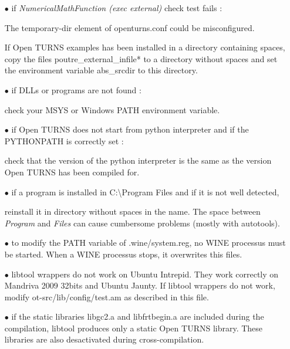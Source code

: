 \documentclass[11pt]{article}
\begin{document}
\begin{itemize}
\item[$\bullet$]   if \emph{NumericalMathFunction (exec external)} check test fails :

  The temporary-dir element of openturns.conf could be misconfigured.

  If Open TURNS examples has been installed in a directory containing spaces, copy the files poutre\_external\_infile* to a directory without spaces and set the environment variable abs\_srcdir to this directory.

\item[$\bullet$]   if DLLs or programs are not found :

  check your MSYS or Windows PATH environment variable.
\item[$\bullet$]   if Open TURNS does not start from python interpreter and if the PYTHONPATH is correctly set :

  check that the version of the python interpreter is the same as the version Open TURNS has been compiled for.
\item[$\bullet$]   if a program is installed in C:\textbackslash Program Files and if it is not well detected,

  reinstall it in directory without spaces in the name. The space between \emph{Program} and \emph{Files} can cause cumbersome problems (mostly with autotools).

\item[$\bullet$]   to modify the PATH variable of .wine/system.reg, no WINE processus must be started. When a WINE processus stops, it overwrites this files.

\item[$\bullet$]   libtool wrappers do not work on Ubuntu Intrepid. They work correctly on Mandriva 2009 32bits and Ubuntu Jaunty. If libtool wrappers do not work, modify ot-src/lib/config/test.am as described in this file.

\item[$\bullet$]   if the static libraries libgc2.a and libfrtbegin.a are included during the compilation, libtool produces only a static Open TURNS library. These libraries are also desactivated during cross-compilation.

\end{itemize}
\end{document}

